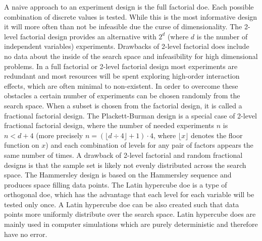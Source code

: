 A naive approach to an experiment design is the full factorial \gls{doe}.
Each possible combination of discrete values is tested. 
While this is the most informative design it will more often than not be infeasible due the curse of dimensionality\cite{cherkassky1998learning}.
The 2-level factorial design provides an alternative with $2^d$ (where $d$ is the number of independent variables) experiments. 
Drawbacks of 2-level factorial \gls{doe}s include no data about the inside of the search space and infeasibility for high dimensional problems.
In a full factorial or 2-level factorial design most experiments are redundant and most resources will be spent exploring high-order interaction effects\cite{gunst2009fractional}, which are often minimal to non-existent.
In order to overcome these obstacles a certain number of experiments can be chosen randomly from the search space. 
%
When a subset is chosen from the factorial design, it is called a fractional factorial design. 
%
%
The Plackett-Burman\cite{vanaja2007design,miller2001using,wang1995hidden} design is a special case of 2-level fractional factorial design, 
where the number of needed experiments $n$ is $n<d+4$ 
(more precisely $n=(\lfloor d\div4\rfloor+1)\cdot4$, where $\lfloor x\rfloor$ denotes the floor function on $x$) 
and each combination of levels for any pair of factors appears the same number of times. 
A drawback of 2-level factorial and random fractional designs is that the sample set is likely not evenly distributed across the search space\cite{viana2016tutorial}. 
The Hammersley design\cite{viana2016tutorial,diwekar1997efficient} is based on the Hammersley sequence and produces space filling data points. 
The Latin hypercube \gls{doe}\cite{viana2016tutorial,diwekar1997efficient} is a type of orthogonal \gls{doe}, 
which has the advantage that each level for each variable will be tested only once. 
A Latin hypercube \gls{doe} can be also created such that data points more uniformly distribute over the search space. 
Latin hypercube \gls{doe}s are mainly used in computer simulations which are purely deterministic and therefore have no error. 
%
\iffalse
%

